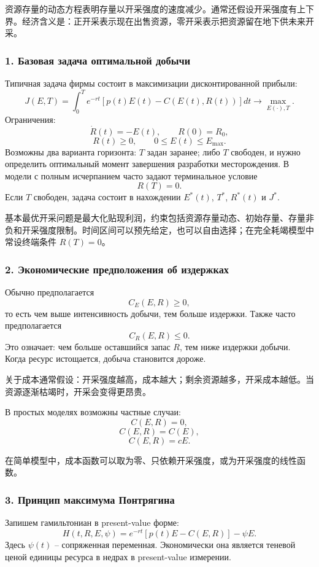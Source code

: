 \documentclass[12pt,a4paper]{article}
\newcommand{\zh}[1]{\par\noindent #1\par}
\begin{document}
\zh{资源存量的动态方程表明存量以开采强度的速度减少。通常还假设开采强度有上下界。经济含义是：正开采表示现在出售资源，零开采表示把资源留在地下供未来开采。}


\subsubsection*{1. Базовая задача оптимальной добычи}
Типичная задача фирмы состоит в максимизации дисконтированной прибыли:
\[
J(E,T)=\int_0^T e^{-rt}\left[p(t)E(t)-C(E(t),R(t))\right]dt\to \max_{E(\cdot),T}.
\]
Ограничения:
\[
\dot R(t)=-E(t),\qquad R(0)=R_0,
\]
\[
R(t)\ge 0,
\qquad
0\le E(t)\le E_{\max}.
\]
Возможны два варианта горизонта: $T$ задан заранее; либо $T$ свободен, и нужно определить оптимальный момент завершения разработки месторождения. В модели с полным исчерпанием часто задают терминальное условие
\[
R(T)=0.
\]
Если $T$ свободен, задача состоит в нахождении $E^*(t)$, $T^*$, $R^*(t)$ и $J^*$.

\zh{基本最优开采问题是最大化贴现利润，约束包括资源存量动态、初始存量、存量非负和开采强度限制。时间区间可以预先给定，也可以自由选择；在完全耗竭模型中常设终端条件 $R(T)=0$。}

\subsubsection*{2. Экономические предположения об издержках}
Обычно предполагается
\[
C_E(E,R)\ge 0,
\]
то есть чем выше интенсивность добычи, тем больше издержки. Также часто предполагается
\[
C_R(E,R)\le 0.
\]
Это означает: чем больше оставшийся запас $R$, тем ниже издержки добычи. Когда ресурс истощается, добыча становится дороже.

\zh{关于成本通常假设：开采强度越高，成本越大；剩余资源越多，开采成本越低。当资源逐渐枯竭时，开采会变得更昂贵。}

В простых моделях возможны частные случаи:
\[
C(E,R)=0,
\]
\[
C(E,R)=C(E),
\]
\[
C(E,R)=cE.
\]

\zh{在简单模型中，成本函数可以取为零、只依赖开采强度，或为开采强度的线性函数。}


\subsubsection*{3. Принцип максимума Понтрягина}
Запишем гамильтониан в present-value форме:
\[
H(t,R,E,\psi)=e^{-rt}\left[p(t)E-C(E,R)\right]-\psi E.
\]
Здесь $\psi(t)$ -- сопряженная переменная. Экономически она является теневой ценой единицы ресурса в недрах в present-value измерении.
\end{document}
